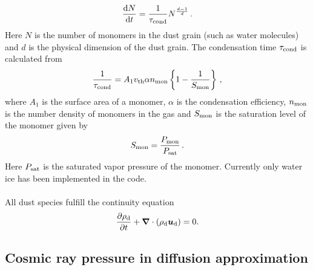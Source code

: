 \documentclass[\mydriver,12pt,twoside,notitlepage,a4paper]{article}
\makeatletter
\newcommand{\name}[2][]{%
  \def\index@{#1}%
  \textsl{#2\/}%
  \ifx\index@\@empty\index{#2@\MakeUppercase #2}%
  \else\index{#1}%
  \fi%
}
\newcommand{\de}      {\mathrm{d}}
\renewcommand{\vec}[1]{\mbox{\boldmath{$#1$}}}
\newcommand{\Fv}            {\vec{F}}
\newcommand{\fv}            {\vec{f}}
\newcommand{\uv}            {\vec{u}}
\newcommand{\nab}{\mbox{\boldmath $\nabla$} {}}
\makeatother
\begin{document}
\begin{equation}
  \frac{\de N}{\de t} = \frac{1}{\tau_{\rm cond}} N^{\frac{d-1}{d}} \, .
\end{equation}
Here $N$ is the number of monomers in the dust grain (such as water molecules)
and $d$ is the physical dimension of the dust grain. The condensation time
$\tau_{\rm cond}$ is calculated from
\begin{equation}
  \frac{1}{\tau_{\rm cond}} = A_1 v_{\rm th} \alpha n_{\rm mon}
  \left\{ 1-\frac{1}{S_{\rm mon}} \right\} \, ,
\end{equation}
where $A_1$ is the surface area of a monomer, $\alpha$ is the condensation
efficiency, $n_{\rm mon}$ is the number density of monomers in the gas and
$S_{\rm mon}$ is the saturation level of the monomer given by
\begin{equation}
  S_{\rm mon} = \frac{P_{\rm mon}}{P_{\rm sat}} \, .
\end{equation}
Here $P_{\rm sat}$ is the saturated vapor pressure of the monomer. Currently
only water ice has been implemented in the code.
\\ \\
All dust species fulfill the continuity equation
\begin{equation}
  {\partial\rho_{\rm d}\over\partial t}+\nab\cdot(\rho_{\rm d}\uv_{\rm d})=0.
\end{equation}


\subsection{Cosmic ray pressure in diffusion approximation}
\end{document}
